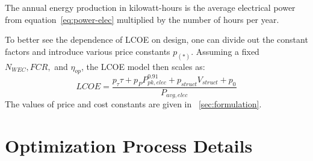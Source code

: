 The annual energy production in kilowatt-hours is the average electrical power from equation~\eqref{eq:power-elec} multiplied by the number of hours per year.

To better see the dependence of LCOE on design, one can divide out the constant factors and introduce various price constants $p_{(*)}$.
Assuming a fixed $N_{WEC}, FCR,$ and $\eta_{op}$, the LCOE model then scales as:
\begin{equation}\label{eq:LCOE-scale}
  LCOE = \frac{p_\tau \tau + p_{P}P_{pk,elec}^{0.91} + p_{struct} V_{struct} + p_0}{P_{avg,elec}}
\end{equation}
The values of price and cost constants are given in \sectionautorefname~\ref{sec:formulation}.



\clearpage
\section{Optimization Process Details}

